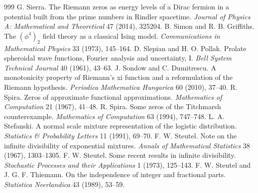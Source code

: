 \begin{thebibliography}{999}
 G. Sierra. The Riemann zeros as energy levels of a Dirac fermion in a potential built from the prime numbers in Rindler spacetime. \emph{Journal of Physics A: Mathematical and Theoretical} 47 (2014), 325204.
 B. Simon and R. B. Griffiths. The $(\phi^4)_2$ field theory as a classical Ising model. \emph{Communications in Mathematical Physics} 33 (1973), 145--164.
 D. Slepian and H. O. Pollak. Prolate spheroidal wave functions, Fourier analysis and uncertainty, I. \emph{Bell System Technical Journal} 40 (1961), 43--63.
 J. Sondow and C. Dumitrescu. A monotonicity property of Riemann's xi function and a reformulation of the Riemann hypothesis. \emph{Periodica Mathematica Hungarica} 60 (2010), 37--40.
 R. Spira. Zeros of approximate functional approximations. \emph{Mathematics of Computation} 21 (1967), 41--48.
 R. Spira. Some zeros of the Titchmarsh counterexample. \emph{Mathematics of Computation} 63 (1994), 747--748.
 L. A. Stefanski. A normal scale mixture representation of the logistic distribution. \emph{Statistics \& Probability Letters} 11 (1991), 69--70.
 F. W. Steutel. Note on the infinite divisibility of exponential mixtures. \emph{Annals of Mathematical Statistics} 38 (1967), 1303--1305.
 F. W. Steutel. Some recent results in infinite divisibility. \emph{Stochastic Processes and their Applications} 1 (1973), 125--143.
 F. W. Steutel and J. G. F. Thiemann. On the independence of integer and fractional parts. \emph{Statistica Neerlandica} 43 (1989), 53--59.

\end{thebibliography}
